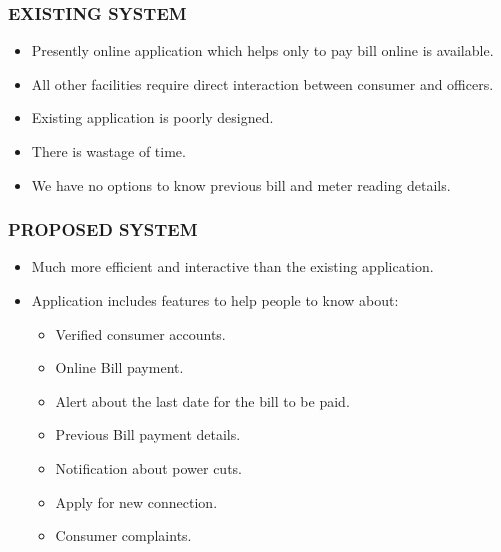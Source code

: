\documentclass{beamer} %
\theoremstyle{definition} %
\begin{document}
\begin{frame}
\frametitle{EXISTING SYSTEM}
	\begin{itemize}
		\item Presently online application which helps only to pay bill online is available.
		\item All other facilities require direct interaction between consumer and officers.
		\item Existing application is poorly designed.
		\item There is wastage of time. 
		\item We have no options to know previous bill and meter reading details.
	\end{itemize}
	\end{frame}
	\begin{frame}
	\frametitle{PROPOSED SYSTEM}
	\begin{itemize}
		\item Much more efficient and interactive than the existing application.
		\item Application includes features to help people to know about:
		\begin{itemize}
		\item  Verified consumer accounts.
		\item  Online Bill payment.
		\item  Alert about the last date for the bill to be paid.
		\item  Previous Bill payment details.
		\item  Notification about power cuts.
		\item  Apply for new connection.
		\item  Consumer complaints.
		\end{itemize} 
		
	
	\end{itemize}
\end{frame}
\end{document}
